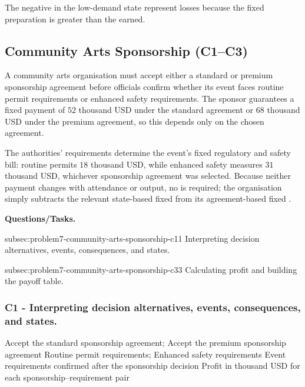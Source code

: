 	The negative  in the low-demand state represent losses because the
	fixed preparation  is greater than the  earned.



	\subsection{Community Arts Sponsorship (C1--C3)}
	\label{sec:problem7-community-arts-sponsorship-c1-c3}

	A community arts organisation must accept either a standard or premium sponsorship agreement before officials confirm whether its event faces routine permit requirements or enhanced safety requirements. The sponsor guarantees a fixed payment of \(52\) thousand USD under the standard agreement or \(68\) thousand USD under the premium agreement, so this  depends only on the chosen agreement.

	The authorities' requirements determine the event's fixed regulatory and safety bill: routine permits  \(18\) thousand USD, while enhanced safety measures  \(31\) thousand USD, whichever sponsorship agreement was selected. Because neither payment changes with attendance or output, no  is required; the organisation simply subtracts the relevant state-based fixed  from its agreement-based fixed .

	\textbf{Questions/Tasks.}
	\begin{enumerate}
		\CriterionTask
		{subsec:problem7-community-arts-sponsorship-c1}{1}
		{Interpreting decision alternatives, events, consequences, and states.}

		\CriterionTask
		{subsec:problem7-community-arts-sponsorship-c3}{3}
		{Calculating profit and building the payoff table.}
	\end{enumerate}

	\subsubsection*{C1 - Interpreting decision alternatives, events, consequences, and states.}
	\label{subsec:problem7-community-arts-sponsorship-c1}

	\DecisionElementsTable
	{Accept the standard sponsorship agreement; Accept the premium sponsorship agreement}
	{Routine permit requirements; Enhanced safety requirements}
	{Event requirements confirmed after the sponsorship decision}
	{Profit in thousand USD for each sponsorship--requirement pair}

